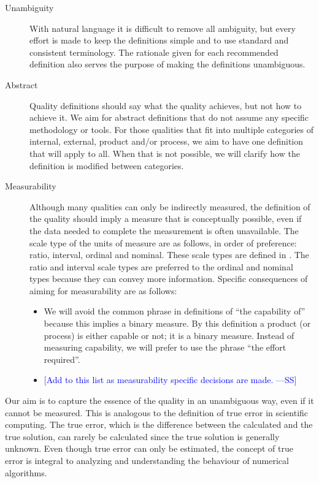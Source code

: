 \documentclass[letterpaper, cleveref]{lipics-v2019}
\newcommand{\authornote}[3]{\textcolor{#1}{[#3 ---#2]}}
\newcommand{\authornote}[3]{}
\newcommand{\wss}[1]{\authornote{blue}{SS}{#1}} %
\theoremstyle{definition}
\begin{document}
\begin{description}
  \item[Unambiguity] With natural language it is difficult to remove all
  ambiguity, but every effort is made to keep the definitions simple and to use
  standard and consistent terminology.  The rationale given for each recommended
  definition also serves the purpose of making the definitions unambiguous.

  \item[Abstract] Quality definitions should say what the quality achieves, but
  not how to achieve it.  We aim for abstract definitions that do not assume any
  specific methodology or tools.  For those qualities that fit into multiple
  categories of internal, external, product and/or process, we aim to have one
  definition that will apply to all.  When that is not possible, we will clarify
  how the definition is modified between categories.

  \item[Measurability] Although many qualities can only be indirectly measured,
  the definition of the quality should imply a measure that is conceptually
  possible, even if the data needed to complete the measurement is often
  unavailable.  The scale type of the units of measure are as follows, in order
  of preference: ratio, interval, ordinal and nominal.  These scale types are
  defined in \citet[p.\ 107]{VanVliet2000}.  The ratio and interval scale types
  are preferred to the ordinal and nominal types because they can convey more
  information.  Specific consequences of aiming for measurability are as
  follows:
  \begin{itemize}
    \item We will avoid the common phrase in definitions of ``the capability
    of'' because this implies a binary measure.  By this definition a product
    (or process) is either capable or not; it is a binary measure.  Instead of
    measuring capability, we will prefer to use the phrase ``the effort
    required''.
    \item \wss{Add to this list as measurability specific decisions are made.}
  \end{itemize}
   
\end{description}

Our aim is to capture the essence of the quality in an unambiguous way, even if
it cannot be measured. This is analogous to the definition of true error in
scientific computing.  The true error, which is the difference between the
calculated and the true solution, can rarely be calculated since the true
solution is generally unknown. Even though true error can only be estimated, the
concept of true error is integral to analyzing and understanding the behaviour
of numerical algorithms.
\end{document}
